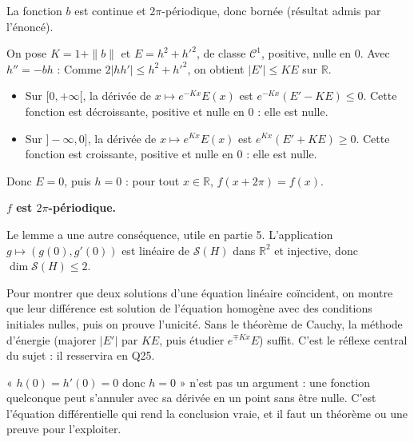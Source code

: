 \documentclass[11pt,a4paper]{article}
\providecommand{\tightlist}{\setlength{\itemsep}{0pt}\setlength{\parskip}{0pt}}
\newcommand{\equationajustee}[1]{%
  \sbox{\boiteequation}{$\displaystyle #1$}%
  \ifdim\wd\boiteequation>\linewidth
    \[\resizebox{\linewidth}{!}{\usebox{\boiteequation}}\]%
  \else
    \[#1\]%
  \fi}
\begin{document}
La fonction \(b\) est continue et \(2\pi\)-périodique, donc bornée (résultat admis par l'énoncé).

On pose \(K=1+\|b\|\) et \(E=h^2+h'^2\), de classe \(\mathcal C^1\), positive, nulle en \(0\). Avec \(h''=-bh\) :
\equationajustee{\begin{aligned}
E'&=2hh'+2h'h''\\
&=2(1-b)hh'.
\end{aligned}}
Comme \(2|hh'|\le h^2+h'^2\), on obtient \(|E'|\le KE\) sur \(\mathbb R\).

\begin{itemize}
\tightlist
\item
  Sur \([0,+\infty[\), la dérivée de \(x\mapsto e^{-Kx}E(x)\) est \(e^{-Kx}(E'-KE)\le0\). Cette fonction est décroissante, positive et nulle en \(0\) : elle est nulle.
\item
  Sur \(]-\infty,0]\), la dérivée de \(x\mapsto e^{Kx}E(x)\) est \(e^{Kx}(E'+KE)\ge0\). Cette fonction est croissante, positive et nulle en \(0\) : elle est nulle.
\end{itemize}

Donc \(E=0\), puis \(h=0\) : pour tout \(x\in\mathbb R\), \(f(x+2\pi)=f(x)\).

\textbf{\(f\) est \(2\pi\)-périodique.}

Le lemme a une autre conséquence, utile en partie 5. L'application \(g\mapsto(g(0),g'(0))\) est linéaire de \(\mathcal S(H)\) dans \(\mathbb R^2\) et injective, donc \(\dim\mathcal S(H)\le2\).

\begin{methode}

Pour montrer que deux solutions d'une équation linéaire coïncident, on montre que leur différence est solution de l'équation homogène avec des conditions initiales nulles, puis on prouve l'unicité. Sans le théorème de Cauchy, la méthode d'énergie (majorer \(|E'|\) par \(KE\), puis étudier \(e^{\mp Kx}E\)) suffit. C'est le réflexe central du sujet : il resservira en Q25.

\end{methode}

\begin{piege}

« \(h(0)=h'(0)=0\) donc \(h=0\) » n'est pas un argument : une fonction quelconque peut s'annuler avec sa dérivée en un point sans être nulle. C'est l'équation différentielle qui rend la conclusion vraie, et il faut un théorème ou une preuve pour l'exploiter.

\end{piege}
\end{document}
